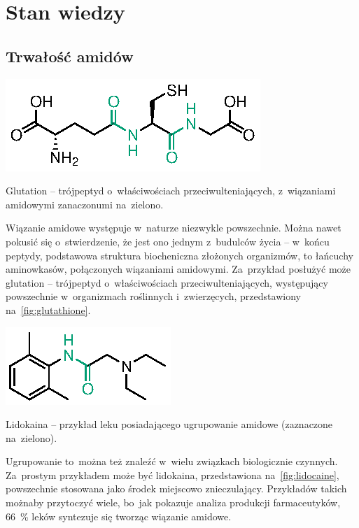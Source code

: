 \chapter{Stan wiedzy}


\section{Trwałość amidów}

\begin{marginfigure}[7\baselineskip]
  \includegraphics{schemes/glutathione}
  \caption{
    Glutation \--- trójpeptyd o~właściwościach przeciwulteniających,
    z~wiązaniami amidowymi zanaczonumi na~zielono.
  }
  \label{fig:glutathione}
\end{marginfigure}
Wiązanie amidowe występuje w~naturze niezwykle powszechnie.
Można nawet pokusić się o~stwierdzenie, że jest ono jednym z~budulców życia \---
w~końcu peptydy, podstawowa struktura biocheniczna złożonych organizmów,
to łańcuchy aminowkasów, połączonych wiązaniami amidowymi.
Za~przykład posłużyć może glutation \--- trójpeptyd o~właściwościach przeciwulteniających,
występujący powszechnie w~organizmach roślinnych i~zwierzęcych\autocite{wu04},
przedstawiony na~\cref{fig:glutathione}.
  
\begin{marginfigure}
  \includegraphics{schemes/lidocaine}
  \caption{
    Lidokaina \--- przykład leku posiadającego ugrupowanie amidowe
    (zaznaczone na~zielono).
  }
  \label{fig:lidocaine}
\end{marginfigure}
Ugrupowanie to~można też znaleźć w~wielu związkach biologicznie czynnych.
Za~prostym przykładem może być lidokaina, przedstawiona na~\cref{fig:lidocaine},
powszechnie stosowana jako środek miejscowo znieczulający.
Przykładów takich możnaby przytoczyć wiele, bo~jak pokazuje analiza produkcji farmaceutyków,
\SI{66}{\percent} leków syntezuje się tworząc wiązanie amidowe\autocite{carey06}.

